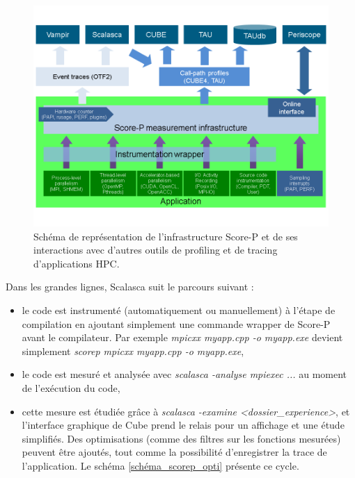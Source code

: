 \documentclass[11pt,a4paper,oneside]{memoir}
\theoremstyle{definition}
\theoremstyle{remark}
\theoremstyle{plain}
\begin{document}
\begin{figure}
\begin{center}
\includegraphics[scale=0.5]{Images-Rapport/score-p-overview.png}
\caption{Schéma de représentation de l'infrastructure Score-P et de ses interactions avec d'autres outils de profiling et de tracing d'applications HPC. \cite{score-p-doc}}
\label{schéma_scorep}
\end{center}
\end{figure}

Dans les grandes lignes, Scalasca suit le parcours suivant :
\begin{itemize}
\item le code est instrumenté (automatiquement ou manuellement) à l'étape de compilation en ajoutant simplement une commande wrapper de Score-P avant le compilateur. Par exemple \textit{mpicxx myapp.cpp -o myapp.exe} devient simplement \textit{scorep mpicxx myapp.cpp -o myapp.exe},
\item le code est mesuré et analysée avec \textit{scalasca -analyse mpiexec ...} au moment de l'exécution du code,
\item cette mesure est étudiée grâce à \textit{scalasca -examine <dossier\_experience>}, et l'interface graphique de Cube prend le relais pour un affichage et une étude simplifiés. Des optimisations (comme des filtres sur les fonctions mesurées) peuvent être ajoutés, tout comme la possibilité d'enregistrer la trace de l'application. Le schéma \ref{schéma_scorep_opti} présente ce cycle.
\end{itemize}
\end{document}
